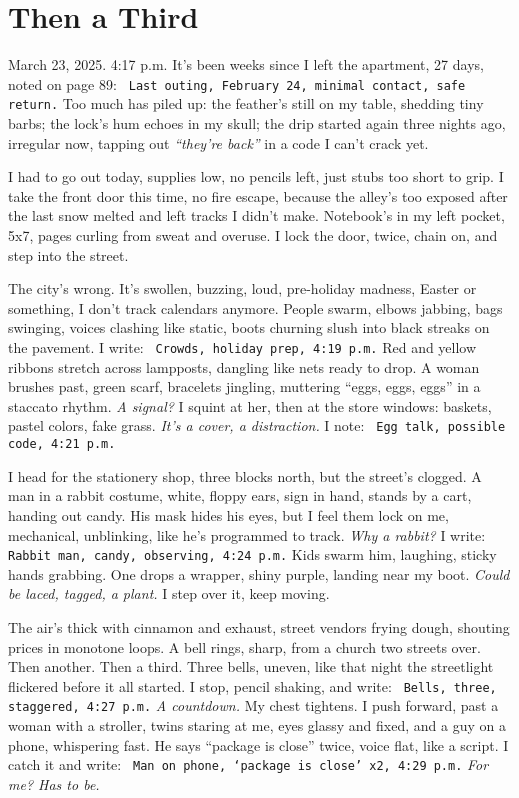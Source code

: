 \documentclass[12pt]{article}
\newcommand{\note}[1]{\texttt{\small \color{DarkGray} #1}}
\begin{document}
\section{Then a Third}

March 23, 2025. 4:17 p.m. It’s been weeks since I left the apartment, 27 days, noted on page 89: \note{Last outing, February 24, minimal contact, safe return.} Too much has piled up: the feather’s still on my table, shedding tiny barbs; the lock’s hum echoes in my skull; the drip started again three nights ago, irregular now, tapping out \textit{“they’re back”} in a code I can’t crack yet.

I had to go out today, supplies low, no pencils left, just stubs too short to grip. I take the front door this time, no fire escape, because the alley’s too exposed after the last snow melted and left tracks I didn’t make. Notebook’s in my left pocket, 5x7, pages curling from sweat and overuse. I lock the door, twice, chain on, and step into the street.

The city’s wrong. It’s swollen, buzzing, loud, pre-holiday madness, Easter or something, I don’t track calendars anymore. People swarm, elbows jabbing, bags swinging, voices clashing like static, boots churning slush into black streaks on the pavement. I write: \note{Crowds, holiday prep, 4:19 p.m.} Red and yellow ribbons stretch across lampposts, dangling like nets ready to drop. A woman brushes past, green scarf, bracelets jingling, muttering “eggs, eggs, eggs” in a staccato rhythm. \textit{A signal?} I squint at her, then at the store windows: baskets, pastel colors, fake grass. \textit{It’s a cover, a distraction.} I note: \note{Egg talk, possible code, 4:21 p.m.}

I head for the stationery shop, three blocks north, but the street’s clogged. A man in a rabbit costume, white, floppy ears, sign in hand, stands by a cart, handing out candy. His mask hides his eyes, but I feel them lock on me, mechanical, unblinking, like he’s programmed to track. \textit{Why a rabbit?} I write: \note{Rabbit man, candy, observing, 4:24 p.m.} Kids swarm him, laughing, sticky hands grabbing. One drops a wrapper, shiny purple, landing near my boot. \textit{Could be laced, tagged, a plant.} I step over it, keep moving.

The air’s thick with cinnamon and exhaust, street vendors frying dough, shouting prices in monotone loops. A bell rings, sharp, from a church two streets over. Then another. Then a third. Three bells, uneven, like that night the streetlight flickered before it all started. I stop, pencil shaking, and write: \note{Bells, three, staggered, 4:27 p.m.} \textit{A countdown.} My chest tightens. I push forward, past a woman with a stroller, twins staring at me, eyes glassy and fixed, and a guy on a phone, whispering fast. He says “package is close” twice, voice flat, like a script. I catch it and write: \note{Man on phone, ‘package is close’ x2, 4:29 p.m.} \textit{For me? Has to be.}
\end{document}
